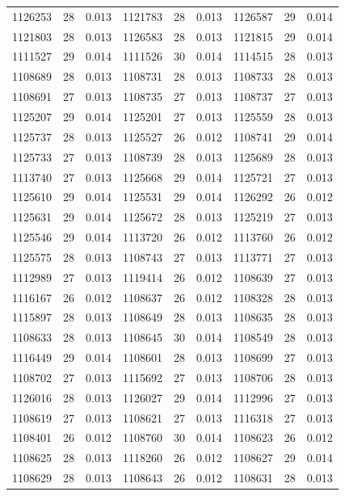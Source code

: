 \documentclass[11pt,a4paper]{article}
\begin{document}
\begin{longtable}{rrr|rrr|rrr}
1126253 & 28 & 0.013 & 1121783 & 28 & 0.013 & 1126587 & 29 & 0.014\\
1121803 & 28 & 0.013 & 1126583 & 28 & 0.013 & 1121815 & 29 & 0.014\\
1111527 & 29 & 0.014 & 1111526 & 30 & 0.014 & 1114515 & 28 & 0.013\\
1108689 & 28 & 0.013 & 1108731 & 28 & 0.013 & 1108733 & 28 & 0.013\\
1108691 & 27 & 0.013 & 1108735 & 27 & 0.013 & 1108737 & 27 & 0.013\\
1125207 & 29 & 0.014 & 1125201 & 27 & 0.013 & 1125559 & 28 & 0.013\\
1125737 & 28 & 0.013 & 1125527 & 26 & 0.012 & 1108741 & 29 & 0.014\\
1125733 & 27 & 0.013 & 1108739 & 28 & 0.013 & 1125689 & 28 & 0.013\\
1113740 & 27 & 0.013 & 1125668 & 29 & 0.014 & 1125721 & 27 & 0.013\\
1125610 & 29 & 0.014 & 1125531 & 29 & 0.014 & 1126292 & 26 & 0.012\\
1125631 & 29 & 0.014 & 1125672 & 28 & 0.013 & 1125219 & 27 & 0.013\\
1125546 & 29 & 0.014 & 1113720 & 26 & 0.012 & 1113760 & 26 & 0.012\\
1125575 & 28 & 0.013 & 1108743 & 27 & 0.013 & 1113771 & 27 & 0.013\\
1112989 & 27 & 0.013 & 1119414 & 26 & 0.012 & 1108639 & 27 & 0.013\\
1116167 & 26 & 0.012 & 1108637 & 26 & 0.012 & 1108328 & 28 & 0.013\\
1115897 & 28 & 0.013 & 1108649 & 28 & 0.013 & 1108635 & 28 & 0.013\\
1108633 & 28 & 0.013 & 1108645 & 30 & 0.014 & 1108549 & 28 & 0.013\\
1116449 & 29 & 0.014 & 1108601 & 28 & 0.013 & 1108699 & 27 & 0.013\\
1108702 & 27 & 0.013 & 1115692 & 27 & 0.013 & 1108706 & 28 & 0.013\\
1126016 & 28 & 0.013 & 1126027 & 29 & 0.014 & 1112996 & 27 & 0.013\\
1108619 & 27 & 0.013 & 1108621 & 27 & 0.013 & 1116318 & 27 & 0.013\\
1108401 & 26 & 0.012 & 1108760 & 30 & 0.014 & 1108623 & 26 & 0.012\\
1108625 & 28 & 0.013 & 1118260 & 26 & 0.012 & 1108627 & 29 & 0.014\\
1108629 & 28 & 0.013 & 1108643 & 26 & 0.012 & 1108631 & 28 & 0.013\\

\end{longtable}
\end{document}
